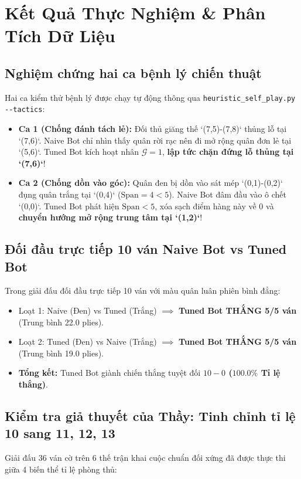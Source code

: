 \documentclass[11pt,a4paper]{article}
\begin{document}
\FloatBarrier
\section{Kết Quả Thực Nghiệm \& Phân Tích Dữ Liệu}

\subsection{Nghiệm chứng hai ca bệnh lý chiến thuật}
Hai ca kiểm thử bệnh lý được chạy tự động thông qua \texttt{heuristic\_self\_play.py -{}-tactics}:
\begin{itemize}
    \item \textbf{Ca 1 (Chống đánh tách lẻ):} Đối thủ giăng thế `(7,5)-(7,8)` thủng lỗ tại `(7,6)`. Naive Bot chỉ nhìn thấy quân rời rạc nên đi mở rộng quân đơn lẻ tại `(5,6)`. Tuned Bot kích hoạt nhân $\mathcal{G}=1$, \textbf{lập tức chặn đứng lỗ thủng tại `(7,6)`}!
    \item \textbf{Ca 2 (Chống dồn vào góc):} Quân đen bị dồn vào sát mép `(0,1)-(0,2)` đụng quân trắng tại `(0,4)` ($\text{Span} = 4 < 5$). Naive Bot đâm đầu vào ô chết `(0,0)`. Tuned Bot phát hiện $\text{Span} < 5$, xóa sạch điểm hàng này về 0 và \textbf{chuyển hướng mở rộng trung tâm tại `(1,2)`}!
\end{itemize}

\subsection{Đối đầu trực tiếp 10 ván Naive Bot vs Tuned Bot}
Trong giải đấu đối đầu trực tiếp 10 ván với màu quân luân phiên bình đẳng:
\begin{itemize}
    \item Loạt 1: Naive (Đen) vs Tuned (Trắng) $\implies$ \textbf{Tuned Bot THẮNG 5/5 ván} (Trung bình 22.0 plies).
    \item Loạt 2: Tuned (Đen) vs Naive (Trắng) $\implies$ \textbf{Tuned Bot THẮNG 5/5 ván} (Trung bình 19.0 plies).
    \item \textbf{Tổng kết:} Tuned Bot giành chiến thắng tuyệt đối \textbf{$10 - 0$ ($100.0\%$ Tỉ lệ thắng)}.
\end{itemize}

\subsection{Kiểm tra giả thuyết của Thầy: Tinh chỉnh tỉ lệ 10 sang 11, 12, 13}
Giải đấu 36 ván cờ trên 6 thế trận khai cuộc chuẩn đối xứng đã được thực thi giữa 4 biến thể tỉ lệ phòng thủ:
\end{document}
